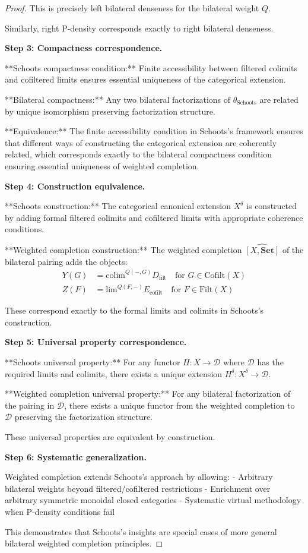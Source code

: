 \documentclass[11pt]{article}
\theoremstyle{plain}
\theoremstyle{definition}
\theoremstyle{remark}
\newcommand{\colim}{\mathrm{colim}}
\renewcommand{\lim}{\mathrm{lim}}
\newcommand{\wh}[1]{\widehat{#1}}
\begin{document}
\begin{proof}
This is precisely left bilateral denseness for the bilateral weight $Q$.

Similarly, right P-density corresponds exactly to right bilateral denseness.

\textbf{Step 3: Compactness correspondence.}

**Schoots compactness condition:** Finite accessibility between filtered colimits and cofiltered limits ensures essential uniqueness of the categorical extension.

**Bilateral compactness:** Any two bilateral factorizations of $\theta_{\text{Schoots}}$ are related by unique isomorphism preserving factorization structure.

**Equivalence:** The finite accessibility condition in Schoots's framework ensures that different ways of constructing the categorical extension are coherently related, which corresponds exactly to the bilateral compactness condition ensuring essential uniqueness of weighted completion.

\textbf{Step 4: Construction equivalence.}

**Schoots construction:** The categorical canonical extension $X^{\delta}$ is constructed by adding formal filtered colimits and cofiltered limits with appropriate coherence conditions.

**Weighted completion construction:** The weighted completion $\wh{[X, \mathbf{Set}]}$ of the bilateral pairing adds the objects:
\begin{align}
Y(G) &= \colim^{Q(-, G)} D_{\text{filt}} \quad \text{for } G \in \text{Cofilt}(X) \\
Z(F) &= \lim^{Q(F, -)} E_{\text{cofilt}} \quad \text{for } F \in \text{Filt}(X)
\end{align}

These correspond exactly to the formal limits and colimits in Schoots's construction.

\textbf{Step 5: Universal property correspondence.}

**Schoots universal property:** For any functor $H : X \to \mathcal{D}$ where $\mathcal{D}$ has the required limits and colimits, there exists a unique extension $H^{\delta} : X^{\delta} \to \mathcal{D}$.

**Weighted completion universal property:** For any bilateral factorization of the pairing in $\mathcal{D}$, there exists a unique functor from the weighted completion to $\mathcal{D}$ preserving the factorization structure.

These universal properties are equivalent by construction.

\textbf{Step 6: Systematic generalization.}

Weighted completion extends Schoots's approach by allowing:
- Arbitrary bilateral weights beyond filtered/cofiltered restrictions
- Enrichment over arbitrary symmetric monoidal closed categories
- Systematic virtual methodology when P-density conditions fail

This demonstrates that Schoots's insights are special cases of more general bilateral weighted completion principles.
\end{proof}
\end{document}

